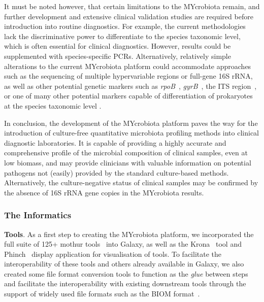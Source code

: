 It must be noted however, that certain limitations to the MYcrobiota remain, and further development and extensive clinical validation studies are required before introduction into routine diagnostics. For example, the current methodologies lack the discriminative power to differentiate to the species taxonomic level, which is often essential for clinical diagnostics. However, results could be supplemented with species-specific PCRs. Alternatively, relatively simple alterations to the current MYcrobiota platform could accommodate approaches such as the sequencing of multiple hypervariable regions or full-gene 16S rRNA, as well as other potential genetic markers such as \emph{rpoB}~\cite{adekambi2009rpob}, \emph{gyrB}~\cite{yanamoto1995pcr}, the ITS region~\cite{schoch20012nuclear}, or one of many other potential markers capable of differentiation of prokaryotes at the species taxonomic level \cite{lab2016marker,sabat2017targeted}.

In conclusion, the development of the MYcrobiota platform paves the way for the introduction of culture-free quantitative microbiota profiling methods into clinical diagnostic laboratories. It is capable of providing a highly accurate and comprehensive profile of the microbial composition of clinical samples, even at low biomass, and may provide clinicians with valuable information on potential pathogens not (easily) provided by the standard culture-based methods. Alternatively, the culture-negative status of clinical samples may be confirmed by the absence of 16S rRNA gene copies in the MYcrobiota results.

\subsubsection{The Informatics}

\textbf{Tools}. As a first step to creating the MYcrobiota platform, we incorporated the full suite of 125+ mothur tools~\cite{schloss} into Galaxy, as well as the Krona~\cite{ondov2015krona} tool and Phinch~\cite{bik2014phinch} display application for visualisation of tools. To facilitate the interoperability of these tools and others already available in Galaxy, we also created some file format conversion tools to function as the \emph{glue} between steps and facilitate the interoperability with existing downstream tools through the support of widely used file formats such as the BIOM format~\cite{mcdonald2012biological}.



